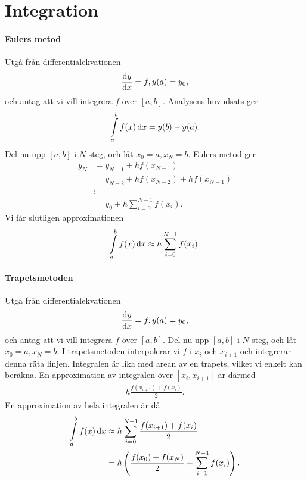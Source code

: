 \section{Integration}

\paragraph{Eulers metod}
Utgå från differentialekvationen
\begin{align*}
	\dv{y}{x} = f, y(a) = y_{0},
\end{align*}
och antag att vi vill integrera $f$ över $[a, b]$. Analysens huvudsats ger
\begin{align*}
	\int\limits_{a}^{b}f(x)\dd{x} = y(b) - y(a).
\end{align*}
Del nu upp $[a, b]$ i $N$ steg, och låt $x_{0} = a, x_{N} = b$. Eulers metod ger
\begin{align*}
	y_{N} &= y_{N - 1} + hf(x_{N - 1}) \\
	      &= y_{N - 2} + hf(x_{N - 2}) + hf(x_{N - 1}) \\
	      &\vdots \\
	      &= y_{0} + h\sum\limits_{i = 0}^{N - 1}f(x_{i}).
\end{align*}
Vi får slutligen approximationen
\begin{align*}
	\int\limits_{a}^{b}f(x)\dd{x} \approx h\sum\limits_{i = 0}^{N - 1}f(x_{i}).
\end{align*}

\paragraph{Trapetsmetoden}
Utgå från differentialekvationen
\begin{align*}
	\dv{y}{x} = f, y(a) = y_{0},
\end{align*}
och antag att vi vill integrera $f$ över $[a, b]$. Del nu upp $[a, b]$ i $N$ steg, och låt $x_{0} = a, x_{N} = b$. I trapetsmetoden interpolerar vi $f$ i $x_{i}$ och $x_{i + 1}$ och integrerar denna räta linjen. Integralen är lika med arean av en trapets, vilket vi enkelt kan beräkna. En approximation av integralen över $[x_{i}, x_{i + 1}]$ är därmed
\begin{align*}
	h\frac{f(x_{i + 1}) + f(x_{i})}{2}.
\end{align*}
En approximation av hela integralen är då
\begin{align*}
	\int\limits_{a}^{b}f(x)\dd{x} &\approx h\sum\limits_{i = 0}^{N - 1}\frac{f(x_{i + 1}) + f(x_{i})}{2} \\
	                        &= h\left(\frac{f(x_{0}) + f(x_{N})}{2} + \sum\limits_{i = 1}^{N - 1}f(x_{i})\right).
\end{align*}

